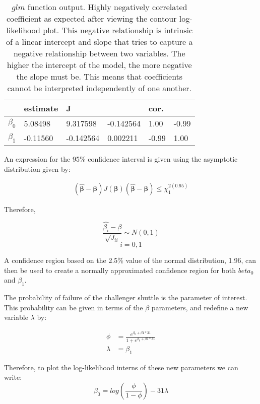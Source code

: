 \documentclass[12pt]{article}
\begin{document}
\begin{table}[H]
	\begin{center}
		\begin{tabular}{l | l | l l | l l }
		&estimate &J& & cor.\\
		\hline
		$\beta_0$ & 5.08498 & 9.317598 & -0.142564 & 1.00 & -0.99 \\
		$\beta_1$  & -0.11560 & -0.142564 & 0.002211 & -0.99 & 1.00\\
		\hline
		\end{tabular}
	\end{center}
	\caption{$glm$ function output. Highly negatively correlated coefficient as expected after viewing the contour log-likelihood plot. This negative relationship is intrinsic of a linear intercept and slope that tries to capture a negative relationship between two variables. The higher the intercept of the model, the more negative the slope must be. This means that coefficients cannot be interpreted independently of one another.}
\end{table}

An expression for the 95\% confidence interval is given using the asymptotic distribution given by:

\begin{align*}
(\hat{\boldsymbol \beta}-\boldsymbol \beta) J(\boldsymbol \beta) ( \hat{\boldsymbol \beta}-\boldsymbol \beta) \leq \chi^{2 (0.95)}_1
\end{align*}

Therefore,

\[\frac{\hat{\beta_i}-\beta}{\sqrt {J_{ii}}} \sim N(0,1)\] 
\[i = 0,1\]

A confidence region based on the 2.5\% value of the normal distribution, 1.96, can then be used to create a normally approximated confidence region for both $beta_0$ and $\beta_1$.

\item
The probability of failure of the challenger shuttle is the parameter of interest. This probability can be given in terms of the $\beta$ parameters, and redefine a new variable $\lambda$ by:

\begin{align*}
\phi&=\frac{e^{\beta_0+\beta1*31}}{1+e^{\beta_0+\beta1*31}}\\
\lambda&=\beta_1
\end{align*}

Therefore, to plot the log-likelihood interns of these new parameters we can write:
\[\beta_0 = log(\frac{\phi}{1-\phi}) - 31\lambda\]
\end{document}
